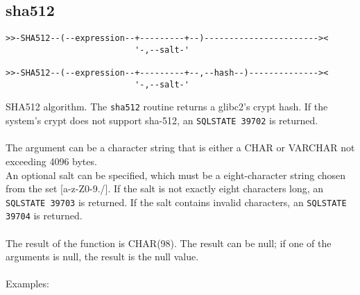 \subsection{sha512} \label{sha512}
\begin{verbatim}
>>-SHA512--(--expression--+---------+--)-----------------------><
                          '-,--salt-'

>>-SHA512--(--expression--+---------+--,--hash--)--------------><
                          '-,--salt-'
\end{verbatim}
SHA512 algorithm. The {\tt sha512} routine returns a glibc2's crypt hash. If the system's crypt does not support sha-512, an \mbox{{\tt SQLSTATE 39702}} is returned.\\
\\
The argument can be a character string that is either a \mbox{CHAR} or \mbox{VARCHAR} not exceeding 4096 bytes.\\
An optional salt can be specified, which must be a eight-character string chosen from the set [a-z-Z0-9./]. If the salt is not exactly eight characters long, an \mbox{{\tt SQLSTATE 39703}} is returned. If the salt contains invalid characters, an \mbox{{\tt SQLSTATE 39704}} is returned.\\
\\
The result of the function is CHAR(98). The result can be null; if one of the arguments is null, the result is the null value.\\
\\
Examples:
